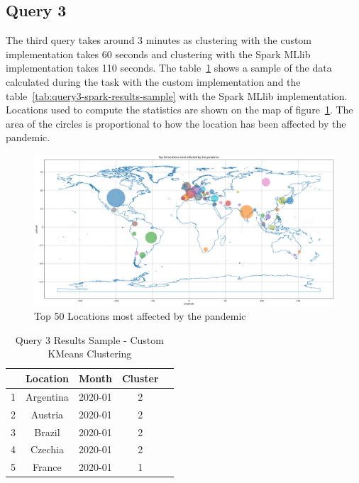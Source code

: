 \documentclass[12pt,oneside]{book} %
\begin{document}
\newpage
\subsection{Query 3}

The third query takes around 3 minutes as clustering with the custom
implementation takes 60 seconds and clustering with the Spark MLlib
implementation takes 110 seconds. The
table~\ref{tab:query3-custom-results-sample} shows a sample of the data
calculated during the task with the custom implementation and the
table~\ref{tab:query3-spark-results-sample} with the Spark MLlib
implementation. Locations used to compute the statistics are shown on the map
of figure~\ref{fig:top-50-locations-most-affected}. The area of the circles is
proportional to how the location has been affected by the pandemic.

\begin{figure}[H]
    \centering
    \includegraphics[width=1\linewidth]{images/top-50-locations-most-affected.png}
    \caption{Top 50 Locations most affected by the pandemic}\label{fig:top-50-locations-most-affected}
\end{figure}

\begin{table}[H]
    \centering
    \captionsetup{font=large}
    \caption{Query 3 Results Sample - Custom KMeans Clustering}
    \normalsize
    \begin{tabular}{|l|c|c|c|c|}
        \hline
          & Location  & Month   & Cluster \\
        \hline
        1 & Argentina & 2020-01 & 2       \\
        2 & Austria   & 2020-01 & 2       \\
        3 & Brazil    & 2020-01 & 2       \\
        4 & Czechia   & 2020-01 & 2       \\
        5 & France    & 2020-01 & 1       \\
        \hline
    \end{tabular}\label{tab:query3-custom-results-sample}
\end{table}
\end{document}
